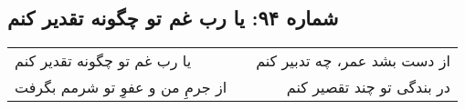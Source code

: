 \begin{center}
\section*{شماره ۹۴: یا رب غم تو چگونه تقدیر کنم}
\label{sec:094}
\begin{longtable}{l p{0.5cm} r}
یا رب غم تو چگونه تقدیر کنم
&&
از دست بشد عمر، چه تدبیر کنم
\\
از جرمِ من و عفوِ تو شرمم بگرفت
&&
در بندگی تو چند تقصیر کنم
\\
\end{longtable}
\end{center}
